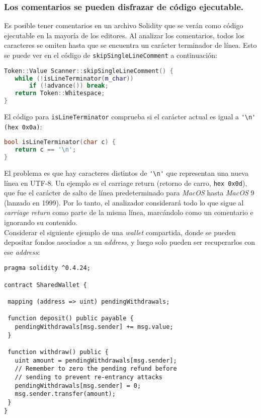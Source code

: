 \subsubsection{Los comentarios se pueden disfrazar de código ejecutable.}

Es posible tener comentarios en un archivo Solidity que se verán como código ejecutable en la mayoría de los editores. Al analizar los comentarios, todos los caracteres se omiten hasta que se encuentra un carácter terminador de línea. Esto se puede ver en el código de \verb|skipSingleLineComment| a continuación:\\

\begin{lstlisting}[language=c++]
Token::Value Scanner::skipSingleLineComment() {
   while (!isLineTerminator(m_char))
       if (!advance()) break;
   return Token::Whitespace;
}
\end{lstlisting}

El código para \verb|isLineTerminator| comprueba si el carácter actual es igual a \verb|'\n' (hex 0x0a)|:
\begin{lstlisting}[language=c++]
bool isLineTerminator(char c) {
   return c == '\n';
}
\end{lstlisting}

El problema es que hay caracteres distintos de \verb|'\n'| que representan una nueva línea en UTF-8. Un ejemplo es el carriage return (retorno de carro, \verb|hex 0x0d|), que fue el carácter de salto de línea predeterminado para \textit{MacOS} hasta \textit{MacOS} 9 (lanzado en 1999). Por lo tanto, el analizador considerará todo lo que sigue al \textit{carriage return} como parte de la misma línea, marcándolo como un comentario e ignorando su contenido.\\

Considerar el siguiente ejemplo de una \textit{wallet} compartida, donde se pueden depositar fondos asociados a un \textit{address}, y luego solo pueden ser recuperarlos con ese \textit{address}:\\

\begin{lstlisting}[language=Solidity]
pragma solidity ^0.4.24;

contract SharedWallet {

 mapping (address => uint) pendingWithdrawals;

 function deposit() public payable {
   pendingWithdrawals[msg.sender] += msg.value;
 }

 function withdraw() public {
   uint amount = pendingWithdrawals[msg.sender];
   // Remember to zero the pending refund before
   // sending to prevent re-entrancy attacks
   pendingWithdrawals[msg.sender] = 0;  
   msg.sender.transfer(amount);
 }
}
\end{lstlisting}


